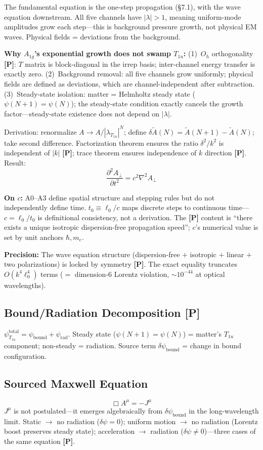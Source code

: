 \documentclass[11pt,a4paper]{article}
\newcommand{\gradeP}{\textbf{[P]}}
\begin{document}
The fundamental equation is the one-step propagation (\S7.1), with the wave equation downstream. All five channels have $|\lambda|>1$, meaning uniform-mode amplitudes grow each step---this is background pressure growth, not physical EM waves. Physical fields = deviations from the background.

\textbf{Why $A_{1g}$'s exponential growth does not swamp $T_{1u}$:}
(1)~$O_h$ orthogonality \gradeP: $T$ matrix is block-diagonal in the irrep basis; inter-channel energy transfer is exactly zero.
(2)~Background removal: all five channels grow uniformly; physical fields are defined as deviations, which are channel-independent after subtraction.
(3)~Steady-state isolation: matter = Helmholtz steady state ($\psi(N{+}1)=\psi(N)$); the steady-state condition exactly cancels the growth factor---steady-state existence does not depend on $|\lambda|$.

Derivation: renormalize $A\to A/|\lambda_{T_{1u}}|^N$; define $\delta\tilde{A}(N) = \tilde{A}(N{+}1)-\tilde{A}(N)$; take second difference. Factorization theorem ensures the ratio $\delta^2/k^2$ is independent of $|k|$ \gradeP; trace theorem ensures independence of $k$ direction \gradeP. Result:
$$\frac{\partial^2 A_\perp}{\partial t^2} = c^2\nabla^2 A_\perp$$

\textbf{On $c$:} A0--A3 define spatial structure and stepping rules but do not independently define time. $t_0 \equiv \ell_0/c$ maps discrete steps to continuous time---$c = \ell_0/t_0$ is definitional consistency, not a derivation. The \gradeP{} content is ``there exists a unique isotropic dispersion-free propagation speed''; $c$'s numerical value is set by unit anchors $\hbar, m_e$.

\textbf{Precision:} The wave equation structure (dispersion-free $+$ isotropic $+$ linear $+$ two polarizations) is locked by symmetry \gradeP. The exact equality truncates $O(k^4\ell_0^4)$ terms ($=$ dimension-6 Lorentz violation, $\sim 10^{-44}$ at optical wavelengths).

\subsection{Bound/Radiation Decomposition \gradeP}
$\psi_{T_{1u}}^{\mathrm{total}} = \psi_{\mathrm{bound}} + \psi_{\mathrm{rad}}$. Steady state ($\psi(N{+}1)=\psi(N)$) = matter's $T_{1u}$ component; non-steady = radiation. Source term $\delta\psi_{\mathrm{bound}}$ = change in bound configuration.

\subsection{Sourced Maxwell Equation}
$$\Box A^\mu = -J^\mu$$
$J^\mu$ is not postulated---it emerges algebraically from $\delta\psi_{\mathrm{bound}}$ in the long-wavelength limit. Static $\to$ no radiation ($\delta\psi{=}0$); uniform motion $\to$ no radiation (Lorentz boost preserves steady state); acceleration $\to$ radiation ($\delta\psi{\neq}0$)---three cases of the same equation \gradeP.
\end{document}
